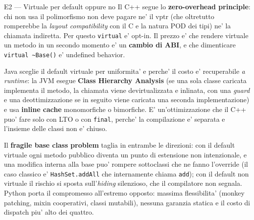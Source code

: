 \documentclass{report}
\newcommand{\code}[1]{\texttt{\small #1}}
\begin{document}
\begin{soluzione}{E2 --- Virtuale per default oppure no}
\label{sol:E2}
Il C++ segue lo \textbf{zero-overhead principle}: chi non usa il polimorfismo
non deve pagare ne' il vptr (che oltretutto romperebbe la \emph{layout
compatibility} con il C e la natura POD dei tipi) ne' la chiamata indiretta. Per
questo \code{virtual} e' opt-in. Il prezzo e' che rendere virtuale un metodo in
un secondo momento e' un \textbf{cambio di ABI}, e che dimenticare
\code{virtual \~{}Base()} e' undefined behavior.

Java sceglie il default virtuale per uniformita' e perche' il costo e'
recuperabile \emph{a runtime}: la JVM esegue \textbf{Class Hierarchy Analysis}
(se una sola classe caricata implementa il metodo, la chiamata viene
devirtualizzata e inlinata, con una \emph{guard} e una deottimizzazione se in
seguito viene caricata una seconda implementazione) e usa \textbf{inline cache}
monomorfiche o bimorfiche. E' un'ottimizzazione che il C++ puo' fare solo con
LTO o con \code{final}, perche' la compilazione e' separata e l'insieme delle
classi non e' chiuso.

Il \textbf{fragile base class problem} taglia in entrambe le direzioni: con il
default virtuale ogni metodo pubblico diventa un punto di estensione non
intenzionale, e una modifica interna alla base puo' rompere sottoclassi che ne
fanno l'override (il caso classico e' \code{HashSet.addAll} che internamente
chiama \code{add}); con il default non virtuale il rischio si sposta
sull'\emph{hiding} silenzioso, che il compilatore non segnala. Python porta il
compromesso all'estremo opposto: massima flessibilita' (monkey patching, mixin
cooperativi, classi mutabili), nessuna garanzia statica e il costo di dispatch
piu' alto dei quattro.
\end{soluzione}
\end{document}
